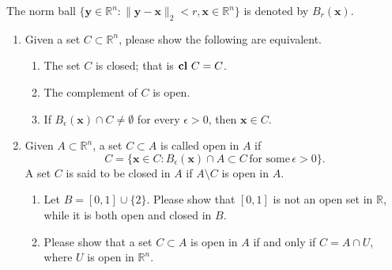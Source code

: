 \documentclass[11pt,letter,notitlepage]{article}
\DeclareMathOperator*{\cl}{\bf cl\,}
\theoremstyle{definition}
\begin{document}
\begin{exercise}
    The norm ball $\{\mathbf{y} \in \mathbb{R}^n:\|\mathbf{y}-\mathbf{x}\|_2<r, \mathbf{x}\in \mathbb{R}^n\}$ is denoted by $B_r(\mathbf{x})$.
    \begin{enumerate}
        \item Given a set $C \subset \mathbb{R}^n$, please show the following are equivalent.
        \begin{enumerate}
            \item The set $C$ is closed; that is $\cl C=C$.
            \item The complement of $C$ is open.
            \item If $B_{\epsilon}(\mathbf{x})\cap C \not=\emptyset$ for every $\epsilon>0$, then $\mathbf{x}\in C$.
        \end{enumerate}
        \item Given $A\subset\mathbb{R}^n$, a set $C\subset A$ is called open in $A$ if $$C=\{\mathbf{x}\in C: B_{\epsilon}(\mathbf{x})\cap A \subset C\,\text{for some}\, \epsilon>0\}.$$
        A set $C$ is said to be closed in $A$ if $A\setminus C$ is open in $A$.
        \begin{enumerate}
            \item Let $B= [0,1] \cup \{2\}$.  Please show that $[0,1]$ is not an open set in $\mathbb{R}$, while it is both open and closed in $B$.
            \item Please show that a set $C \subset A$ is open in $A$ if and only if $C=A\cap U$, where $U$ is open in $\mathbb{R}^n$.
        \end{enumerate}

    \end{enumerate}
\end{exercise}
\end{document}
